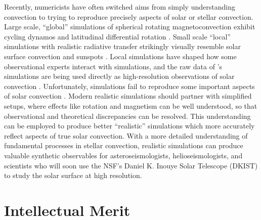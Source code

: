 \documentclass[11pt, preprint]{aastex}
\begin{document}
Recently, numericists have often switched aims from simply understanding convection to trying to reproduce precisely aspects of solar or stellar convection.
Large scale, ``global'' simulations of spherical rotating magnetoconvection exhibit cycling dynamos and latitudinal differential rotation \citep{brown&all2010, brown&all2011, guerrero&all2016, hotta&all2016, brun&all2017, strugarek&all2018}.
Small scale ``local'' simulations with realistic radiative transfer strikingly visually resemble solar surface convection and sunspots \citep{stein&nordlund1998, rempel&all2009, stein&nordlund2012, rempel2014}.
Local simulations have shaped how some observational experts interact with simulations, and the raw data of \citet{rempel2014}'s simulations are being used directly as high-resolution observations of solar convection \citep[see e.g.,][and others]{vankooten&cranmer2017, shchukina&trujillo2019}.
Unfortunately, simulations fail to reproduce some important aspects of solar convection \citep{hanasoge&all2015}.
Modern realistic simulations should partner with simplified setups, where effects like rotation and magnetism can be well understood, so that observational and theoretical discrepancies can be resolved.
This understanding can be employed to produce better ``realistic'' simulations which more accurately reflect aspects of true solar convection.
With a more detailed understanding of fundamental processes in stellar convection, realistic simulations can produce valuable synthetic observables for asteroseismologists, helioseismologists, and scientists who will soon use the NSF's Daniel K. Inouye Solar Telescope (DKIST) to study the solar surface at high resolution.


\section{Intellectual Merit}
\vspace{-6pt}

\label{sct:intellectual_merit}
\end{document}
